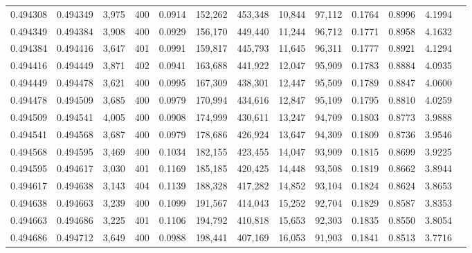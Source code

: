 \begin{tabular}{rrrrrrrrrrrrr}
0.494308 & 0.494349 & 3,975 & 400 &                                     0.0914 & 152,262 & 453,348 &  10,844 &  97,112 & 0.1764 & 0.8996 & 4.1994 \\
0.494349 & 0.494384 & 3,908 & 400 &                                     0.0929 & 156,170 & 449,440 &  11,244 &  96,712 & 0.1771 & 0.8958 & 4.1632 \\
0.494384 & 0.494416 & 3,647 & 401 &                                     0.0991 & 159,817 & 445,793 &  11,645 &  96,311 & 0.1777 & 0.8921 & 4.1294 \\
0.494416 & 0.494449 & 3,871 & 402 &                                     0.0941 & 163,688 & 441,922 &  12,047 &  95,909 & 0.1783 & 0.8884 & 4.0935 \\
0.494449 & 0.494478 & 3,621 & 400 &                                     0.0995 & 167,309 & 438,301 &  12,447 &  95,509 & 0.1789 & 0.8847 & 4.0600 \\
0.494478 & 0.494509 & 3,685 & 400 &                                     0.0979 & 170,994 & 434,616 &  12,847 &  95,109 & 0.1795 & 0.8810 & 4.0259 \\
0.494509 & 0.494541 & 4,005 & 400 &                                     0.0908 & 174,999 & 430,611 &  13,247 &  94,709 & 0.1803 & 0.8773 & 3.9888 \\
0.494541 & 0.494568 & 3,687 & 400 &                                     0.0979 & 178,686 & 426,924 &  13,647 &  94,309 & 0.1809 & 0.8736 & 3.9546 \\
0.494568 & 0.494595 & 3,469 & 400 &                                     0.1034 & 182,155 & 423,455 &  14,047 &  93,909 & 0.1815 & 0.8699 & 3.9225 \\
0.494595 & 0.494617 & 3,030 & 401 &                                     0.1169 & 185,185 & 420,425 &  14,448 &  93,508 & 0.1819 & 0.8662 & 3.8944 \\
0.494617 & 0.494638 & 3,143 & 404 &                                     0.1139 & 188,328 & 417,282 &  14,852 &  93,104 & 0.1824 & 0.8624 & 3.8653 \\
0.494638 & 0.494663 & 3,239 & 400 &                                     0.1099 & 191,567 & 414,043 &  15,252 &  92,704 & 0.1829 & 0.8587 & 3.8353 \\
0.494663 & 0.494686 & 3,225 & 401 &                                     0.1106 & 194,792 & 410,818 &  15,653 &  92,303 & 0.1835 & 0.8550 & 3.8054 \\
0.494686 & 0.494712 & 3,649 & 400 &                                     0.0988 & 198,441 & 407,169 &  16,053 &  91,903 & 0.1841 & 0.8513 & 3.7716 \\

\end{tabular}
